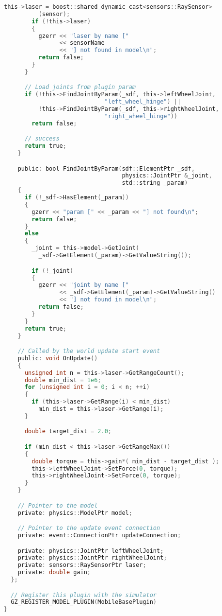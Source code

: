 \begin{lstlisting}[language={C}, caption={机器人控制扩展组件}]
        this->laser = boost::shared_dynamic_cast<sensors::RaySensor>
          (sensor);
        if (!this->laser)
        {
          gzerr << "laser by name ["
                << sensorName
                << "] not found in model\n";
          return false;
        }
      }

      // Load joints from plugin param
      if (!this->FindJointByParam(_sdf, this->leftWheelJoint,
                             "left_wheel_hinge") ||
          !this->FindJointByParam(_sdf, this->rightWheelJoint,
                             "right_wheel_hinge"))
        return false;

      // success
      return true;
    }

    public: bool FindJointByParam(sdf::ElementPtr _sdf,
                                  physics::JointPtr &_joint,
                                  std::string _param)
    {
      if (!_sdf->HasElement(_param))
      {
        gzerr << "param [" << _param << "] not found\n";
        return false;
      }
      else
      {
        _joint = this->model->GetJoint(
          _sdf->GetElement(_param)->GetValueString());

        if (!_joint)
        {
          gzerr << "joint by name ["
                << _sdf->GetElement(_param)->GetValueString()
                << "] not found in model\n";
          return false;
        }
      }
      return true;
    }

    // Called by the world update start event
    public: void OnUpdate()
    {
      unsigned int n = this->laser->GetRangeCount();
      double min_dist = 1e6;
      for (unsigned int i = 0; i < n; ++i)
      {
        if (this->laser->GetRange(i) < min_dist)
          min_dist = this->laser->GetRange(i);
      }

      double target_dist = 2.0;

      if (min_dist < this->laser->GetRangeMax())
      {
        double torque = this->gain*( min_dist - target_dist );
        this->leftWheelJoint->SetForce(0, torque);
        this->rightWheelJoint->SetForce(0, torque);
      }
    }

    // Pointer to the model
    private: physics::ModelPtr model;

    // Pointer to the update event connection
    private: event::ConnectionPtr updateConnection;

    private: physics::JointPtr leftWheelJoint;
    private: physics::JointPtr rightWheelJoint;
    private: sensors::RaySensorPtr laser;
    private: double gain;
  };

  // Register this plugin with the simulator
  GZ_REGISTER_MODEL_PLUGIN(MobileBasePlugin)
}
\end{lstlisting}

